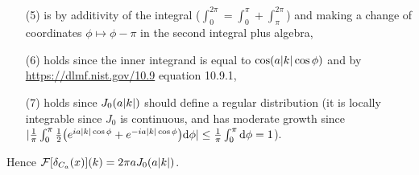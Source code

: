\documentclass[11pt]{article}
\begin{document}
\begin{enumerate}
\begin{enumerate}[label=(\roman*)]
\begin{enumerate}
            \item[(5)] is by additivity of the integral ($\int_0^{2\pi} = \int_0^\pi + \int_\pi^{2\pi}$) and making a change of coordinates $\phi\mapsto\phi - \pi$ in the second integral plus algebra,
            \item[(6)] holds since the inner integrand is equal to $\cos(a\abs{k}\cos\phi)$ and by \hyperref{https://dlmf.nist.gov/10.9}{website}{https://dlmf.nist.gov/10.9}{https://dlmf.nist.gov/10.9} equation 10.9.1,
            \item[(7)] holds since $J_0(a\abs{k})$ should define a regular distribution (it is locally integrable since $J_0$ is continuous, and has moderate growth since $|\frac{1}{\pi}\int_0^{\pi} \frac{1}{2}\big(e^{ia \abs{k}\cos\phi}+e^{-ia \abs{k}\cos\phi}\big)\dd \phi|\leq \frac{1}{\pi}\int_0^\pi \dd\phi = 1$).
        \end{enumerate} Hence $\mathcal F[\delta_{C_a}(x)](k) = 2\pi a J_0(a\abs{k})$.
    \end{enumerate}

    \hrulefill


\end{enumerate}
\end{document}
